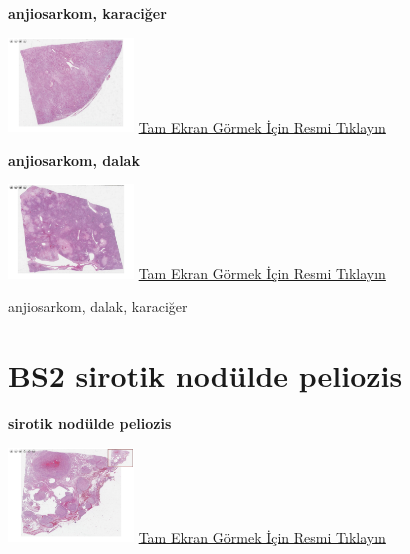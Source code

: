 \documentclass[
  letterpaper,
  DIV=11,
  numbers=noendperiod]{scrreprt}
\begin{document}
\textbf{anjiosarkom, karaciğer}

\href{https://images.patolojiatlasi.com/BS1/HE1.html}{\includegraphics[width=0.25\textwidth,height=\textheight]{./screenshots/thumbnail_BS1-HE1.png}}
\href{https://images.patolojiatlasi.com/BS1/HE1.html}{Tam Ekran Görmek
İçin Resmi Tıklayın}

\textbf{anjiosarkom, dalak}

\href{https://images.patolojiatlasi.com/BS1/HE2.html}{\includegraphics[width=0.25\textwidth,height=\textheight]{./screenshots/thumbnail_BS1-HE2.png}}
\href{https://images.patolojiatlasi.com/BS1/HE2.html}{Tam Ekran Görmek
İçin Resmi Tıklayın}

\begin{tcolorbox}[enhanced jigsaw, breakable, opacitybacktitle=0.6, arc=.35mm, colbacktitle=quarto-callout-tip-color!10!white, colback=white, toptitle=1mm, left=2mm, opacityback=0, colframe=quarto-callout-tip-color-frame, titlerule=0mm, rightrule=.15mm, bottomrule=.15mm, toprule=.15mm, bottomtitle=1mm, title=\textcolor{quarto-callout-tip-color}{\faLightbulb}\hspace{0.5em}{Tanı}, coltitle=black, leftrule=.75mm]

anjiosarkom, dalak, karaciğer

\end{tcolorbox}

\hypertarget{sec-BS2}{%
\section{BS2 sirotik nodülde peliozis}\label{sec-BS2}}

\textbf{sirotik nodülde peliozis}

\href{https://images.patolojiatlasi.com/BS2/HE.html}{\includegraphics[width=0.25\textwidth,height=\textheight]{./screenshots/thumbnail_BS2-HE.png}}
\href{https://images.patolojiatlasi.com/BS2/HE.html}{Tam Ekran Görmek
İçin Resmi Tıklayın}
\end{document}
